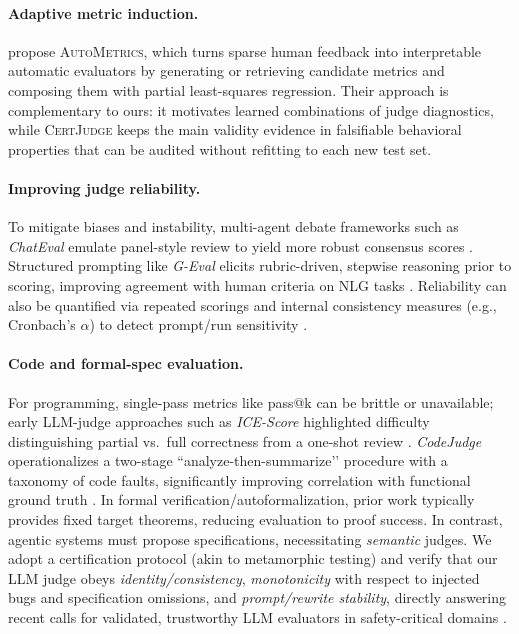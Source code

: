 \documentclass{article}
\begin{document}
\paragraph{Adaptive metric induction.}
\citet{ryan2025autometrics} propose \textsc{AutoMetrics}, which turns sparse human feedback into interpretable automatic evaluators by generating or retrieving candidate metrics and composing them with partial least-squares regression.
Their approach is complementary to ours: it motivates learned combinations of judge diagnostics, while \textsc{CertJudge} keeps the main validity evidence in falsifiable behavioral properties that can be audited without refitting to each new test set.

\paragraph{Improving judge reliability.}
To mitigate biases and instability, multi-agent debate frameworks such as \emph{ChatEval} emulate panel-style review to yield more robust consensus scores \citep{Chan2024ChatEval}. Structured prompting like \emph{G-Eval} elicits rubric-driven, stepwise reasoning prior to scoring, improving agreement with human criteria on NLG tasks \citep{Liu2023GEval}. Reliability can also be quantified via repeated scorings and internal consistency measures (e.g., Cronbach’s $\alpha$) to detect prompt/run sensitivity \citep{Li2024TrustLLMJudgments}.

\paragraph{Code and formal-spec evaluation.}
For programming, single-pass metrics like pass@k can be brittle or unavailable; early LLM-judge approaches such as \emph{ICE-Score} highlighted difficulty distinguishing partial vs.\ full correctness from a one-shot review \citep{Zhuo2024ICEScore}. \emph{CodeJudge} operationalizes a two-stage “analyze-then-summarize’’ procedure with a taxonomy of code faults, significantly improving correlation with functional ground truth \citep{TongZhang2024CodeJudge}. In formal verification/autoformalization, prior work typically provides fixed target theorems, reducing evaluation to proof success. In contrast, agentic systems must propose specifications, necessitating \emph{semantic} judges. We adopt a certification protocol (akin to metamorphic testing) and verify that our LLM judge obeys \emph{identity/consistency}, \emph{monotonicity} with respect to injected bugs and specification omissions, and \emph{prompt/rewrite stability}, directly answering recent calls for validated, trustworthy LLM evaluators in safety-critical domains \citep{Kocmi2024HumanVsLLM,Li2024TrustLLMJudgments}.
\end{document}
